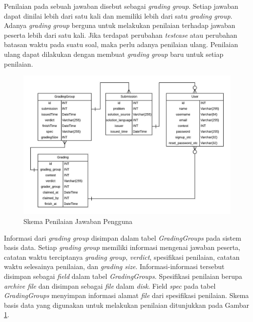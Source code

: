 \par Penilaian pada sebuah jawaban disebut sebagai \textit{grading group}. Setiap jawaban dapat dinilai lebih dari satu kali dan memiliki lebih dari satu \textit{grading group}. Adanya \textit{grading group} berguna untuk melakukan penilaian terhadap jawaban peserta lebih dari satu kali. Jika terdapat perubahan \textit{testcase} atau perubahan batasan waktu pada suatu soal, maka perlu adanya penilaian ulang. Penilaian ulang dapat dilakukan dengan membuat \textit{grading group} baru untuk setiap penilaian.

\begin{figure}[ht!]
    \centering
    \includegraphics[width=\textwidth]{images/grader-schema}
    \caption{Skema Penilaian Jawaban Pengguna}
    \label{fig:grader-schema}
\end{figure}

\par Informasi dari \textit{grading group} disimpan dalam tabel \textit{GradingGroups} pada sistem basis data. Setiap \textit{grading group} memiliki informasi mengenai jawaban peserta, catatan waktu terciptanya \textit{grading group}, \textit{verdict}, spesifikasi penilaian, catatan waktu selesainya penilaian, dan \textit{grading size}. Informasi-informasi tersebut disimpan sebagai \textit{field} dalam tabel \textit{GradingGroups}. Spesifikasi penilaian berupa \textit{archive file} dan disimpan sebagai \textit{file} dalam \textit{disk}. Field \textit{spec} pada tabel \textit{GradingGroups} menyimpan informasi alamat \textit{file} dari spesifikasi penilaian. Skema basis data yang digunakan untuk melakukan penilaian ditunjukkan pada Gambar \ref{fig:grader-schema}.

